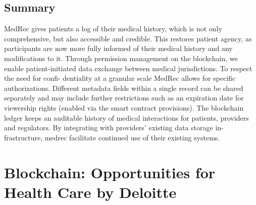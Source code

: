 \documentclass[11pt]{report}
\begin{document}
\subsection{Summary}
MedRec gives patients a log of their medical history,
which is not only comprehensive, but also accessible and
credible. This restores patient agency, as participants are
now more fully informed of their medical history and any
modifications to it. Through permission management on
the blockchain, we enable patient-initiated data exchange
between medical jurisdictions. To respect the need for confi-
dentiality at a granular scale  MedRec allows for specific
authorizations. Different metadata fields within a
single
record can be shared separately and may include further
restrictions such as an expiration date for viewership rights
(enabled via the smart contract provisions). The blockchain
ledger keeps an auditable history of medical interactions for
patients, providers and regulators.
By integrating with providers’ existing data storage in-
frastructure, medrec facilitate continued use of their existing
systems.


\section{Blockchain: Opportunities for Health Care by Deloitte\cite{6}}
\end{document}
